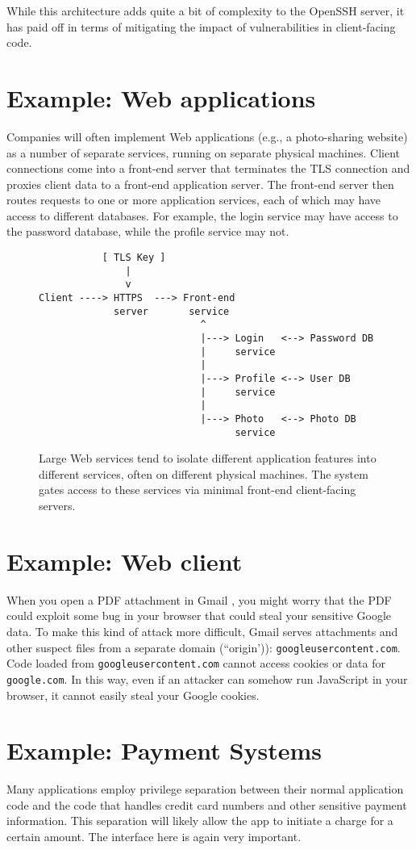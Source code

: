 While this architecture adds quite a bit of complexity to the OpenSSH
server, it has paid off in terms of mitigating the impact of vulnerabilities
in client-facing code.


\section{Example: Web applications}
Companies will often implement Web applications (e.g., a photo-sharing website)
as a number of separate services, running on separate physical machines.
Client connections come into a front-end server that terminates the TLS connection
and proxies client data to a front-end application server.
The front-end server then routes requests to one or more application
services, each of which may have access to different databases.
For example, the login service may have access to the password database,
while the profile service may not.

\begin{figure}
\begin{verbatim}
           [ TLS Key ]
               |                 
               v                  
Client ----> HTTPS  ---> Front-end 
             server       service
                            ^
                            |---> Login   <--> Password DB
                            |     service   
                            |
                            |---> Profile <--> User DB
                            |     service
                            |
                            |---> Photo   <--> Photo DB
                                  service
\end{verbatim}
\caption{Large Web services tend to isolate different application
  features into different services, often on different physical machines.
  The system gates access to these services via minimal front-end client-facing
  servers.}
\end{figure}

\section{Example: Web client}
When you open a PDF attachment in Gmail , you might
worry that the PDF could exploit some bug in your browser that could steal
your sensitive Google data.
To make this kind of attack more difficult, Gmail serves attachments
and other suspect files from a separate domain (``origin')): \texttt{googleusercontent.com}.
Code loaded from \texttt{googleusercontent.com} cannot access cookies
or data for \texttt{google.com}. In this way, even if an attacker can somehow
run JavaScript in your browser, it cannot easily steal your Google cookies.


\section{Example: Payment Systems}
Many applications employ privilege separation between their normal application code and the code that handles credit card numbers and other sensitive payment information. This separation will likely allow the app to initiate a charge for a certain amount. The interface here is again very important.
